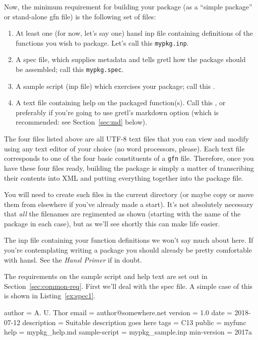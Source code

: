 \documentclass[oneside]{book}
\begin{document}
Now, the minimum requirement for building your package (as a ``simple
package'' or stand-alone \textsf{gfn} file) is the following set of
files:
\begin{enumerate}
\item At least one (for now, let's say one) hansl \textsf{inp} file
  containing definitions of the functions you wish to package. Let's
  call this \texttt{mypkg.inp}.
\item A \textsf{spec} file, which supplies metadata and tells gretl how the
  package should be assembled; call this \texttt{mypkg.spec}.
\item A sample script (\textsf{inp} file) which exercises your
  package; call this .
\item A text file containing help on the packaged function(s). Call
  this , or preferably 
  if you're going to use gretl's markdown option (which is
  recommended: see Section~\ref{sec:md} below).
\end{enumerate}

The four files listed above are all UTF-8 text files that you can view
and modify using any text editor of your choice (no word processors,
please). Each text file corresponds to one of the four basic
constituents of a \texttt{gfn} file. Therefore, once you have these
four files ready, building the package is simply a matter of
transcribing their contents into XML and putting everything together
into the package file.

You will need to create such files in the current directory (or maybe
copy or move them from elsewhere if you've already made a start). It's
not absolutely necessary that \textit{all} the filenames are
regimented as shown (starting with the name of the package in each
case), but as we'll see shortly this can make life easier.

The \textsf{inp} file containing your function definitions we won't
say much about here. If you're contemplating writing a package you
should already be pretty comfortable with hansl. See the \textit{Hansl
  Primer} \citep{hansl-primer} if in doubt.

The requirements on the sample script and help text are set out in
Section~\ref{sec:common-req}.  First we'll deal with the \textsf{spec}
file. A simple case of this is shown in Listing~\ref{ex:spec1}.

\begin{script}[htbp]
  \caption{Simple \texttt{mypkg.spec}}
  \label{ex:spec1}
\begin{code}
author = A. U. Thor
email = author@somewhere.net
version = 1.0
date = 2018-07-12
description = Suitable description goes here
tags = C13
public = myfunc
help = mypkg_help.md
sample-script = mypkg_sample.inp
min-version = 2017a
\end{code}
\end{script}
\end{document}
